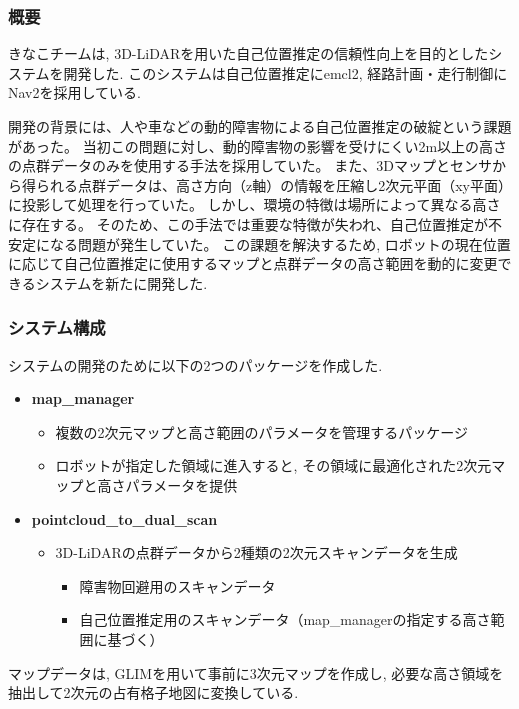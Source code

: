 \subsubsection{概要}
きなこチームは, 3D-LiDARを用いた自己位置推定の信頼性向上を目的としたシステムを開発した. 
このシステムは自己位置推定にemcl2, 経路計画・走行制御にNav2を採用している. 

開発の背景には、人や車などの動的障害物による自己位置推定の破綻という課題があった。
当初この問題に対し、動的障害物の影響を受けにくい2m以上の高さの点群データのみを使用する手法を採用していた。
また、3Dマップとセンサから得られる点群データは、高さ方向（z軸）の情報を圧縮し2次元平面（xy平面）に投影して処理を行っていた。
しかし、環境の特徴は場所によって異なる高さに存在する。
そのため、この手法では重要な特徴が失われ、自己位置推定が不安定になる問題が発生していた。
この課題を解決するため, ロボットの現在位置に応じて自己位置推定に使用するマップと点群データの高さ範囲を動的に変更できるシステムを新たに開発した. 

\subsubsection{システム構成}
システムの開発のために以下の2つのパッケージを作成した. 

\begin{itemize}
  \item \textbf{map\_manager}
    \begin{itemize}
      \item 複数の2次元マップと高さ範囲のパラメータを管理するパッケージ
      \item ロボットが指定した領域に進入すると, その領域に最適化された2次元マップと高さパラメータを提供
    \end{itemize}
  \item \textbf{pointcloud\_to\_dual\_scan}
    \begin{itemize}
      \item 3D-LiDARの点群データから2種類の2次元スキャンデータを生成
        \begin{itemize}
          \item 障害物回避用のスキャンデータ
          \item 自己位置推定用のスキャンデータ（map\_managerの指定する高さ範囲に基づく）
        \end{itemize}
    \end{itemize}
\end{itemize}

マップデータは, GLIMを用いて事前に3次元マップを作成し, 必要な高さ領域を抽出して2次元の占有格子地図に変換している. 


